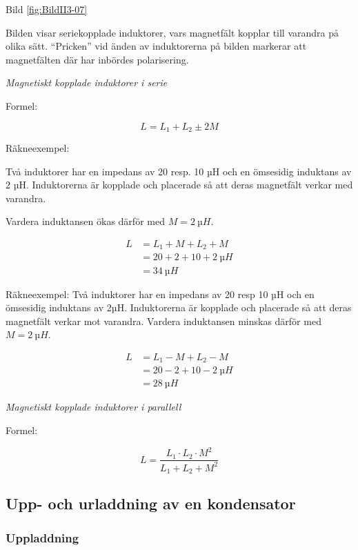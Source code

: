 Bild \ref{fig:BildII3-07}

Bilden visar seriekopplade induktorer, vars magnetfält kopplar till varandra på
olika sätt. ``Pricken'' vid änden av induktorerna på bilden markerar att
magnetfälten där har inbördes polarisering.

\emph{Magnetiskt kopplade induktorer i serie}

Formel:

\[L = L_1 +L_2 \pm 2M\]

Räkneexempel:

Två induktorer har en impedans av 20 resp. 10 µH och en ömsesidig induktans av
2 µH. Induktorerna är kopplade och placerade så att deras magnetfält verkar med
varandra.

Vardera induktansen ökas därför med \(M = 2\ µH\).

\begin{align*}
  L &= L_1 + M + L_2 + M \\
  &= 20 + 2 + 10 + 2\ µH \\
  &= 34\ µH
\end{align*}

Räkneexempel:
Två induktorer har en impedans av 20 resp 10 µH och en ömsesidig induktans av
2µH. Induktorerna är kopplade och placerade så att deras magnetfält verkar mot
varandra. Vardera induktansen minskas därför med \(M = 2\ µH\).

\begin{align*}
  L &= L_1 - M + L_2 - M \\
  & = 20 - 2 + 10 - 2\ µH \\
  &= 28\ µH
\end{align*}

\emph{Magnetiskt kopplade induktorer i parallell}

Formel:

\[L = \frac{L_1 \cdot L_2 \cdot M^2}{L_1 + L_2 + M^2}\]

\subsection{Upp- och urladdning av en kondensator}

\subsubsection{Uppladdning}


